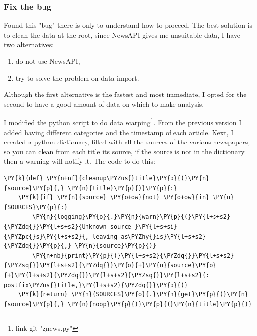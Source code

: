 \subsubsection{Fix the bug}
Found this "bug" there is only to understand how to proceed.
The best solution is to clean the data at the root, since NewsAPI gives me unsuitable data, I have two alternatives:
\begin{enumerate}
    \item do not use NewsAPI,
    \item try to solve the problem on data import.
\end{enumerate}

Although the first alternative is the fastest and most immediate, I opted for the second to have a good amount of data on which to make analysis.

I modified the python script to do data scarping\footnote{link git "gnews.py"}.
From the previous version I added having different categories and the timestamp of each article.
Next, I created a python dictionary, filled with all the sources of the various newspapers, so you can clean from each title its source, if the source is not in the dictionary then a warning will notify it.
The code to do this:
\begin{tcolorbox}[breakable, size=fbox, boxrule=1pt, pad at break*=1mm,colback=cellbackground, colframe=cellborder]
\begin{Verbatim}[commandchars=\\\{\},fontsize=\footnotesize]
\PY{k}{def} \PY{n+nf}{cleanup\PYZus{}title}\PY{p}{(}\PY{n}{source}\PY{p}{,} \PY{n}{title}\PY{p}{)}\PY{p}{:}
    \PY{k}{if} \PY{n}{source} \PY{o+ow}{not} \PY{o+ow}{in} \PY{n}{SOURCES}\PY{p}{:}
        \PY{n}{logging}\PY{o}{.}\PY{n}{warn}\PY{p}{(}\PY{l+s+s2}{\PYZdq{}}\PY{l+s+s2}{Unknown source }\PY{l+s+si}{\PYZpc{}s}\PY{l+s+s2}{, leaving as\PYZhy{}is}\PY{l+s+s2}{\PYZdq{}}\PY{p}{,} \PY{n}{source}\PY{p}{)}
        \PY{n+nb}{print}\PY{p}{(}\PY{l+s+s2}{\PYZdq{}}\PY{l+s+s2}{\PYZsq{}}\PY{l+s+s2}{\PYZdq{}}\PY{o}{+}\PY{n}{source}\PY{o}{+}\PY{l+s+s2}{\PYZdq{}}\PY{l+s+s2}{\PYZsq{}}\PY{l+s+s2}{: postfix\PYZus{}title,}\PY{l+s+s2}{\PYZdq{}}\PY{p}{)}
    \PY{k}{return} \PY{n}{SOURCES}\PY{o}{.}\PY{n}{get}\PY{p}{(}\PY{n}{source}\PY{p}{,} \PY{n}{noop}\PY{p}{)}\PY{p}{(}\PY{n}{title}\PY{p}{)}
\end{Verbatim}
\end{tcolorbox}

